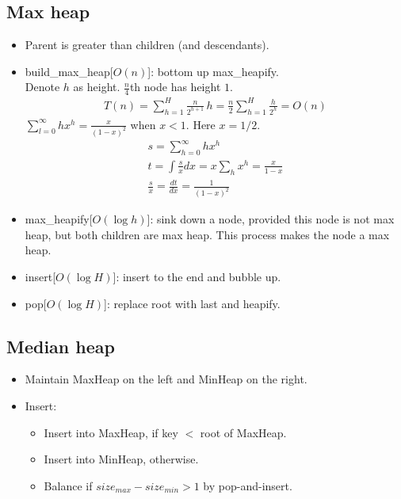 \documentclass[twocolumn]{article}
\begin{document}
\subsection{Max heap}
  \begin{itemize}
  \item Parent is greater than children (and descendants).
  \item build\_max\_heap[$O(n)$]: bottom up max\_heapify.
    \\Denote $h$ as height. $\frac{n}{4}$th node has height $1$.
    \begin{align*}
    T(n) = \sum_{h=1}^{H} \frac{n}{2^{h+1}} \, h = \frac{n}{2} \sum_{h=1}^H \frac{h}{2^h} = O(n)
    \end{align*}
    $\sum_{l=0}^{\infty} h x^h = \frac{x}{(1-x)^2}$ when $x<1$. Here $x = 1/2$.
    \begin{gather*}
    s = \sum_{h=0}^{\infty} h x^h
    \\
    t = \int \frac{s}{x} dx = x \sum_h x^h = \frac{x}{1-x}
    \\
    \frac{s}{x} = \frac{dt}{dx} = \frac{1}{(1-x)^2}
    \end{gather*}
  \item max\_heapify[$O(\log h)$]: sink down a node, provided this node is not max heap, but both children are max heap. This process makes the node a max heap. 
  \item insert[$O(\log H)$]: insert to the end and bubble up.
  \item pop[$O(\log H)$]: replace root with last and heapify.
  \end{itemize}
  

\subsection{Median heap}
\begin{itemize}
\item Maintain MaxHeap on the left and MinHeap on the right.
\item Insert:
  \begin{itemize}
  \item Insert into MaxHeap, if key $<$ root of MaxHeap.
  \item Insert into MinHeap, otherwise.
  \item Balance if $size_{max} - size_{min} > 1$ by pop-and-insert.
  \end{itemize}
\end{itemize}
\end{document}

